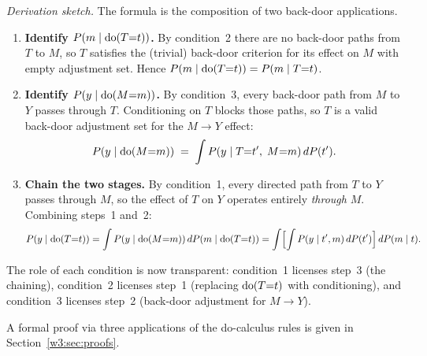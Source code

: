 \documentclass[master.tex]{subfiles}
\begin{document}
\noindent\textit{Derivation sketch.}
The formula is the composition of two back-door applications.
\begin{enumerate}
  \item \textbf{Identify $P(m \mid \mathrm{do}(T{=}t))$.}
        By condition~2 there are no back-door paths from $T$ to $M$,
        so $T$ satisfies the (trivial) back-door criterion for its effect
        on $M$ with empty adjustment set.  Hence
        $P(m \mid \mathrm{do}(T{=}t)) = P(m \mid T{=}t)$.

  \item \textbf{Identify $P(y \mid \mathrm{do}(M{=}m))$.}
        By condition~3, every back-door path from $M$ to $Y$ passes
        through $T$.  Conditioning on $T$ blocks those paths, so $T$ is
        a valid back-door adjustment set for the $M \to Y$ effect:
        \[
          P(y \mid \mathrm{do}(M{=}m))
          \;=\; \int P(y \mid T{=}t',\;M{=}m)\,dP(t').
        \]

  \item \textbf{Chain the two stages.}
        By condition~1, every directed path from $T$ to $Y$ passes
        through $M$, so the effect of $T$ on $Y$ operates entirely
        \emph{through} $M$.  Combining steps~1 and~2:
        \[
          P(y \mid \mathrm{do}(T{=}t))
          = \int P(y \mid \mathrm{do}(M{=}m))\,dP(m \mid \mathrm{do}(T{=}t))
          = \int \Bigl[\int P(y \mid t',m)\,dP(t')\Bigr]\,dP(m \mid t).
        \]
\end{enumerate}
The role of each condition is now transparent: condition~1 licenses
step~3 (the chaining), condition~2 licenses step~1 (replacing
$\mathrm{do}(T{=}t)$ with conditioning), and condition~3 licenses step~2
(back-door adjustment for $M \to Y$).

A formal proof via three applications of the do-calculus rules is given in
Section~\ref{w3:sec:proofs}.
\end{document}

